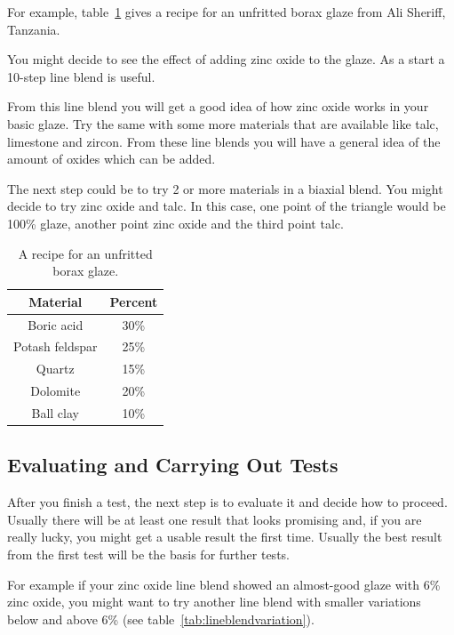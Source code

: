 For example, table~\ref{tab:boraxglaze} gives a recipe for an unfritted borax 
glaze from Ali Sheriff, Tanzania.

You might decide to see the effect of adding zinc oxide to the glaze. As a 
start a 10-step line blend is useful.

From this line blend you will get a good idea of how zinc oxide works in your 
basic glaze. Try the same with some more materials that are available like 
talc, limestone and zircon. From these line blends you will have a general idea 
of the amount of oxides which can be added.

The next step could be to try 2 or more materials in a biaxial blend. You might 
decide to try zinc oxide and talc. In this case, one point of the triangle 
would be 100\% glaze, another point zinc oxide and the third point talc.
  \begin{center}
  \begin{table}\centering
    \renewcommand{\arraystretch}{1.5}
    \begin{tabular}{|c|c|}\hline
    \textbf{Material}&\textbf{Percent}\\\hline\hline
    Boric acid&30\%\\\hline
    Potash feldspar&25\%\\\hline
    Quartz&15\%\\\hline
    Dolomite&20\%\\\hline
    Ball clay&10\%\\\hline
  \end{tabular}
\caption{A recipe for an unfritted borax glaze.}
\label{tab:boraxglaze}
   \end{table}
 \end{center}
\subsection{Evaluating and Carrying Out Tests}
After you finish a test, the next step is to evaluate it and decide how to 
proceed. Usually there will be at least one result that looks promising and, if 
you are really lucky, you might get a usable result the first time. Usually the 
best result from the first test will be the basis for further tests.

For example if your zinc oxide line blend showed an almost-good glaze with 6\% 
zinc oxide, you might want to try another line blend with smaller variations 
below and above 6\% (see table~\ref{tab:lineblendvariation}).

